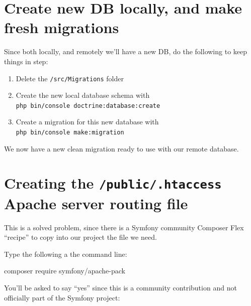 \documentclass[a4paperpaper,openright]{book}
\newenvironment{Shaded}{}{}
\newcommand{\ExtensionTok}[1]{#1}
\newcommand{\NormalTok}[1]{#1}
\begin{document}
\hypertarget{create-new-db-locally-and-make-fresh-migrations}{%
\section{Create new DB locally, and make fresh
migrations}\label{create-new-db-locally-and-make-fresh-migrations}}

Since both locally, and remotely we'll have a new DB, do the following
to keep things in step:

\begin{enumerate}
\def\labelenumi{\arabic{enumi}.}
\item
  Delete the \texttt{/src/Migrations} folder
\item
  Create the new local database schema with
  \texttt{php\ bin/console\ doctrine:database:create}
\item
  Create a migration for this new database with
  \texttt{php\ bin/console\ make:migration}
\end{enumerate}

We now have a new clean migration ready to use with our remote database.

\hypertarget{creating-the-public.htaccess-apache-server-routing-file}{%
\section{\texorpdfstring{Creating the \texttt{/public/.htaccess} Apache
server routing
file}{Creating the /public/.htaccess Apache server routing file}}\label{creating-the-public.htaccess-apache-server-routing-file}}

This is a solved problem, since there is a Symfony community Composer
Flex ``recipe'' to copy into our project the file we need.

Type the following a the command line:

\begin{Shaded}
\begin{Highlighting}[]
    \ExtensionTok{composer}\NormalTok{ require symfony/apache-pack}
\end{Highlighting}
\end{Shaded}

You'll be asked to say ``yes'' since this is a community contribution
and not officially part of the Symfony project:
\end{document}

